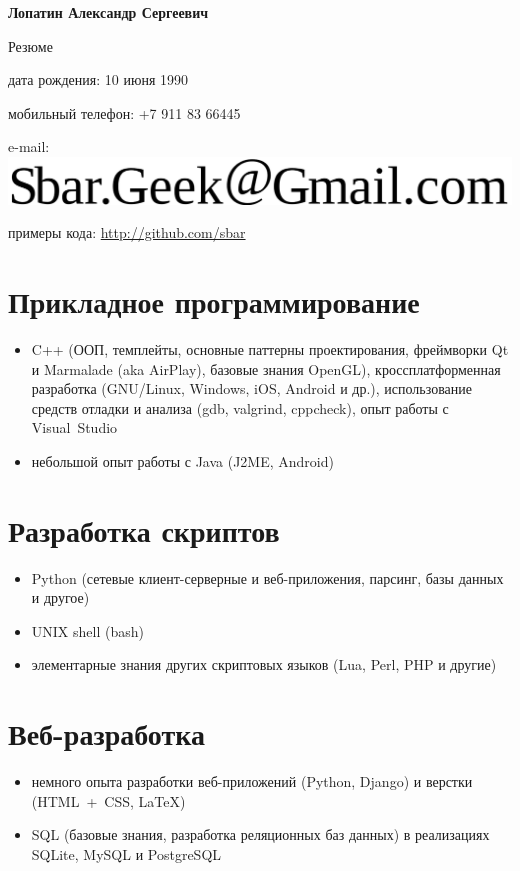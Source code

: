 \begin{center}
\fontsize{16pt}{14pt}\selectfont
\bfseries Лопатин Александр Сергеевич\mdseries

\fontsize{14pt}{14pt}\selectfont
Резюме
\end{center}
{
\fontsize{12pt}{12pt}\selectfont
\begin{flushright}
\item дата рождения: 10 июня 1990
\item мобильный телефон: +7 911 83 66445
\item e-mail: \includegraphics[scale=0.2]{email}
\item примеры кода: \url{http://github.com/sbar}
\end{flushright}
}

\setcounter{section}{0}
\section{Прикладное программирование}
\begin{itemize}
\item C++ (ООП, темплейты, основные паттерны проектирования,
фреймворки Qt и Marmalade (aka AirPlay), базовые знания OpenGL),
кроссплатформенная разработка (GNU/Linux, Windows, iOS, Android и др.),
использование средств отладки и анализа (gdb, valgrind, cppcheck),
опыт работы с Visual~Studio
\item небольшой опыт работы с Java (J2ME, Android)
\end{itemize}

\section{Разработка скриптов}
\begin{itemize}
\item Python (сетевые клиент-серверные и веб-приложения, парсинг, базы данных и
другое)
\item UNIX shell (bash)
\item элементарные знания других скриптовых языков (Lua, Perl, PHP и другие)
\end{itemize}

\section{Веб-разработка}
\begin{itemize}
\item немного опыта разработки веб-приложений (Python, Django)
и верстки (HTML~+~CSS, LaTeX)
\item SQL (базовые знания, разработка реляционных баз данных)
в реализациях SQLite, MySQL и PostgreSQL
\end{itemize}


